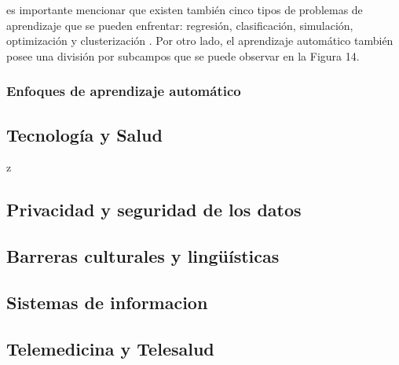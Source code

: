  es importante mencionar que existen también cinco tipos de problemas de aprendizaje que se pueden enfrentar: regresión, clasificación, simulación, optimización y clusterización \parencite{bk_gollapudi2016practical}. Por otro lado, el aprendizaje automático también posee una división por subcampos que se puede observar en la Figura 14.
	\subsubsection{Enfoques de aprendizaje automático}

 \subsection{Tecnología y Salud}
z
 \subsection{Privacidad y seguridad de los datos}


 \subsection{Barreras culturales y lingüísticas}

 \subsection{Sistemas de informacion}

 \subsection{Telemedicina y Telesalud}